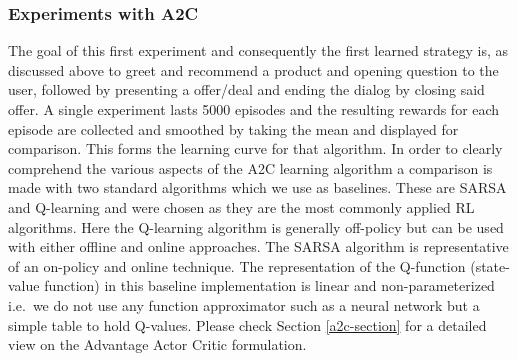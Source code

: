 \documentclass[14pt]{extarticle}
\numberwithin{equation}{section}
\begin{document}
	\subsubsection{Experiments with A2C}
	The goal of this first experiment and consequently the first learned strategy is, as discussed above to greet and recommend a product and opening question to the user, followed by presenting a offer/deal and ending the dialog by closing said offer. A single experiment lasts 5000 episodes and the resulting rewards for each episode are collected and smoothed by taking the mean and displayed for comparison. This forms the learning curve for that algorithm. In order to clearly comprehend the various aspects of the A2C learning algorithm a comparison is made with two standard algorithms which we use as baselines. These are SARSA and Q-learning \cite{Sutton-introRL} and were chosen as they are the most commonly applied RL algorithms. Here the Q-learning algorithm is generally off-policy but can be used with either offline and online approaches. The SARSA algorithm is representative of an on-policy and online technique. The representation of the Q-function (state-value function) in this baseline implementation is linear and non-parameterized i.e.\ we do not use any function approximator such as a neural network but a simple table to hold Q-values. Please check Section \ref{a2c-section} for a detailed view on the Advantage Actor Critic formulation.
\end{document}
